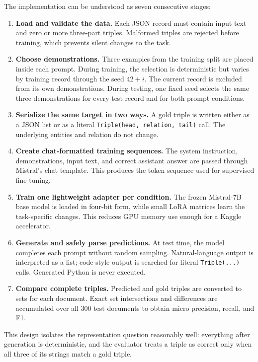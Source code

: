 \documentclass[11pt]{article}
\begin{document}
The implementation can be understood as seven consecutive stages:

\begin{enumerate}
\item
  \textbf{Load and validate the data.} Each JSON record must contain
  input text and zero or more three-part triples. Malformed triples are
  rejected before training, which prevents silent changes to the task.
\item
  \textbf{Choose demonstrations.} Three examples from the training split
  are placed inside each prompt. During training, the selection is
  deterministic but varies by training record through the seed
  $42+i$. The current record is excluded from its own demonstrations.
  During testing, one fixed seed selects the same three demonstrations
  for every test record and for both prompt conditions.
\item
  \textbf{Serialize the same target in two ways.} A gold triple is
  written either as a JSON list or as a literal
  \texttt{Triple(head, relation, tail)} call. The underlying entities and
  relation do not change.
\item
  \textbf{Create chat-formatted training sequences.} The system
  instruction, demonstrations, input text, and correct assistant answer
  are passed through Mistral's chat template. This produces the token
  sequence used for supervised fine-tuning.
\item
  \textbf{Train one lightweight adapter per condition.} The frozen
  Mistral-7B base model is loaded in four-bit form, while small LoRA
  matrices learn the task-specific changes. This reduces GPU memory use
  enough for a Kaggle accelerator.
\item
  \textbf{Generate and safely parse predictions.} At test time, the model
  completes each prompt without random sampling. Natural-language output
  is interpreted as a list; code-style output is searched for literal
  \texttt{Triple(...)} calls. Generated Python is never executed.
\item
  \textbf{Compare complete triples.} Predicted and gold triples are
  converted to sets for each document. Exact set intersections and
  differences are accumulated over all 300 test documents to obtain
  micro precision, recall, and F1.
\end{enumerate}

This design isolates the representation question reasonably well:
everything after generation is deterministic, and the evaluator treats a
triple as correct only when all three of its strings match a gold triple.
\end{document}
